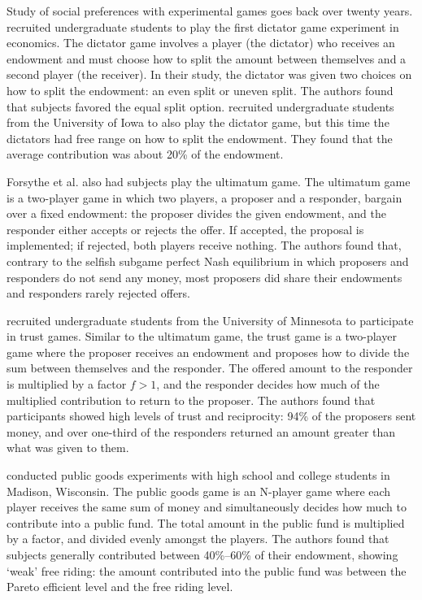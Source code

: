 \documentclass[12pt]{article}
\begin{document}
Study of social preferences with experimental games goes back over twenty years. \cite{kahneman_1986} recruited undergraduate students to play the first dictator game experiment in economics. The dictator game involves a player (the dictator) who receives an endowment and must choose how to split the amount between themselves and a second player (the receiver). In their study, the dictator was given two choices on how to split the endowment: an even split or uneven split. The authors found that subjects favored the equal split option. \cite{forsythe_1994} recruited undergraduate students from the University of Iowa to also play the dictator game, but this time the dictators had free range on how to split the endowment. They found that the average contribution was about 20\% of the endowment.

Forsythe et al. also had subjects play the ultimatum game. The ultimatum game is a two-player game in which two players, a proposer and a responder, bargain over a fixed endowment: the proposer divides the given endowment, and the responder either accepts or rejects the offer. If accepted, the proposal is implemented; if rejected, both players receive nothing. The authors found that, contrary to the selfish subgame perfect Nash equilibrium in which proposers and responders do not send any money, most proposers did share their endowments and responders rarely rejected offers.

\cite{berg_1995} recruited undergraduate students from the University of Minnesota to participate in trust games. Similar to the ultimatum game, the trust game is a two-player game where the proposer receives an endowment and proposes how to divide the sum between themselves and the responder. The offered amount to the responder is multiplied by a factor \(f > 1\), and the responder decides how much of the multiplied contribution to return to the proposer. The authors found that participants showed high levels of trust and reciprocity: 94\% of the proposers sent money, and over one-third of the responders returned an amount greater than what was given to them.

\cite{marwell_1981} conducted public goods experiments with high school and college students in Madison, Wisconsin. The public goods game is an N-player game where each player receives the same sum of money and simultaneously decides how much to contribute into a public fund. The total amount in the public fund is multiplied by a factor, and divided evenly amongst the players. The authors found that subjects generally contributed between 40\%--60\% of their endowment, showing `weak' free riding: the amount contributed into the public fund was between the Pareto efficient level and the free riding level.
\end{document}

